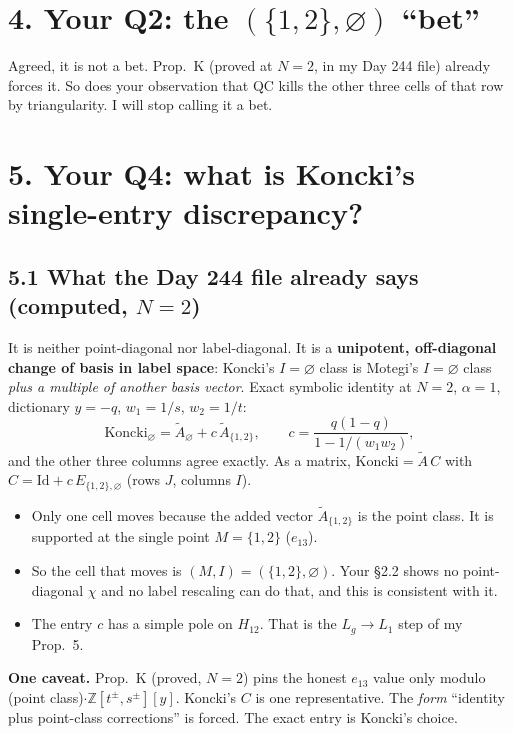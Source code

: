 \documentclass[10pt]{article}
\newcommand{\At}{\tilde A}
\begin{document}
\section*{4. Your Q2: the $(\{1,2\},\varnothing)$ ``bet''}
Agreed, it is not a bet. Prop.~K (proved at $N=2$, in my Day 244 file) already forces it. So does your observation that QC kills the other three cells of that row by triangularity.
I will stop calling it a bet.

\section*{5. Your Q4: what is Koncki's single-entry discrepancy?}
\subsection*{5.1 What the Day 244 file already says (computed, $N=2$)}
It is neither point-diagonal nor label-diagonal. It is a \textbf{unipotent, off-diagonal change of basis in label space}: Koncki's $I=\varnothing$ class is Motegi's
$I=\varnothing$ class \emph{plus a multiple of another basis vector}. Exact symbolic identity at $N=2$, $\alpha=1$, dictionary $y=-q$, $w_1=1/s$, $w_2=1/t$:
\[
 \text{Koncki}_\varnothing=\At_\varnothing+c\,\At_{\{1,2\}},\qquad c=\frac{q(1-q)}{1-1/(w_1w_2)},
\]
and the other three columns agree exactly. As a matrix, $\text{Koncki}=\At\,C$ with $C=\mathrm{Id}+c\,E_{\{1,2\},\varnothing}$ (rows $J$, columns $I$).
\begin{itemize}
\item Only one cell moves because the added vector $\At_{\{1,2\}}$ is the point class. It is supported at the single point $M=\{1,2\}$ ($e_{13}$).
\item So the cell that moves is $(M,I)=(\{1,2\},\varnothing)$. Your \S2.2 shows no point-diagonal $\chi$ and no label rescaling can do that, and this is consistent with it.
\item The entry $c$ has a simple pole on $H_{12}$. That is the $L_g\to L_1$ step of my Prop.~5.
\end{itemize}
\textbf{One caveat.} Prop.~K (proved, $N=2$) pins the honest $e_{13}$ value only modulo (point class)$\cdot\mathbb Z[t^\pm,s^\pm][y]$. Koncki's $C$ is one representative.
The \emph{form} ``identity plus point-class corrections'' is forced. The exact entry is Koncki's choice.
\end{document}
